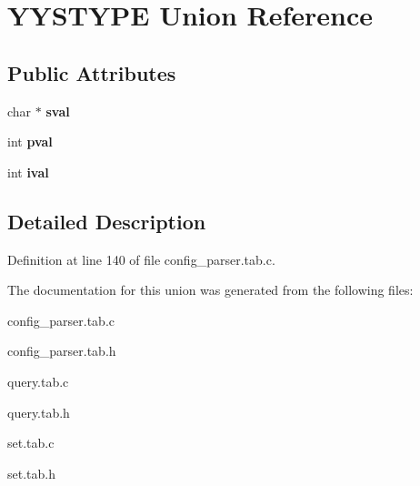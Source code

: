 \hypertarget{unionYYSTYPE}{
\section{YYSTYPE Union Reference}
\label{unionYYSTYPE}
}
\subsection*{Public Attributes}
\begin{DoxyCompactItemize}
\item 
\hypertarget{unionYYSTYPE_a73a5074a72319891e5442106deeb667b}{
char $\ast$ {\bfseries sval}}
\label{unionYYSTYPE_a73a5074a72319891e5442106deeb667b}

\item 
\hypertarget{unionYYSTYPE_afb3aff3b07d86864843a97082b8c020f}{
int {\bfseries pval}}
\label{unionYYSTYPE_afb3aff3b07d86864843a97082b8c020f}

\item 
\hypertarget{unionYYSTYPE_ae9d3f6cba410d8f367f34437acf8c9a2}{
int {\bfseries ival}}
\label{unionYYSTYPE_ae9d3f6cba410d8f367f34437acf8c9a2}

\end{DoxyCompactItemize}


\subsection{Detailed Description}


Definition at line 140 of file config\_\-parser.tab.c.



The documentation for this union was generated from the following files:\begin{DoxyCompactItemize}
\item 
config\_\-parser.tab.c\item 
config\_\-parser.tab.h\item 
query.tab.c\item 
query.tab.h\item 
set.tab.c\item 
set.tab.h\end{DoxyCompactItemize}
